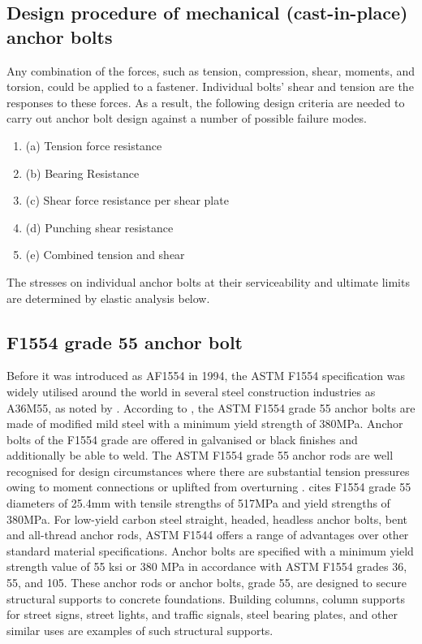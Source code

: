 {\subsection{Design procedure of mechanical (cast-in-place) anchor bolts}

Any combination of the forces, such as tension, compression, shear, moments, and torsion, could be applied to a fastener. Individual bolts' shear and tension are the responses to these forces. As a result, the following design criteria are needed to carry out anchor bolt design against a number of possible failure modes.

\begin{enumerate}[label={}]
\item (a) Tension force resistance
\item(b) Bearing Resistance 
\item(c) Shear force resistance per shear plate
\item (d) Punching shear resistance   
\item (e)  Combined tension and shear
\end{enumerate}
The stresses on individual anchor bolts at their serviceability and ultimate limits are determined by elastic analysis below.




\subsection{F1554 grade 55 anchor bolt}

Before it was introduced as AF1554 in 1994, the ASTM F1554 specification was widely utilised around the world in several steel construction industries as A36M55, as noted by \cite{boltport2007}.
According to \cite{boltport2007}, the ASTM F1554 grade 55 anchor bolts are made of modified mild steel with a minimum yield strength of 380MPa. Anchor bolts of the F1554 grade are offered in galvanised or black finishes and additionally be able to weld.
The ASTM F1554 grade 55 anchor rods are well recognised for design circumstances where there are substantial tension pressures owing to moment connections or uplifted from overturning \cite{nand2020comparative}.
\cite{boltport2007} cites F1554 grade 55 diameters of 25.4mm with tensile strengths of 517MPa and yield strengths of 380MPa.
For low-yield carbon steel straight, headed, headless anchor bolts, bent and all-thread anchor rods, ASTM F1544 offers a range of advantages over other standard material specifications. Anchor bolts are specified with a minimum yield strength value of 55 ksi or 380 MPa in accordance with ASTM F1554 grades 36, 55, and 105. These anchor rods or anchor bolts, grade 55, are designed to secure structural supports to concrete foundations. Building columns, column supports for street signs, street lights, and traffic signals, steel bearing plates, and other similar uses are examples of such structural supports.

}
